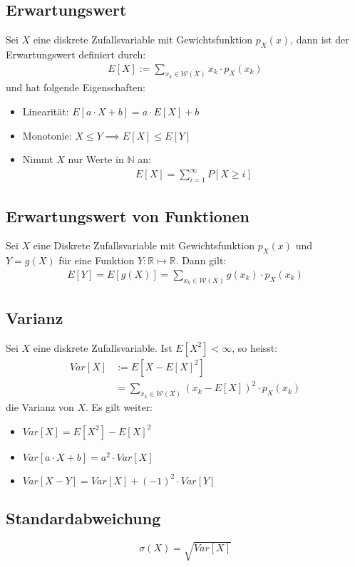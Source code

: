 \documentclass[8pt]{extarticle}
\newcommand{\N}{\mathbb{N}}
\newcommand{\R}{\mathbb{R}}
\newcommand{\W}{\mathcal{W}}
\newcommand{\Sinfty}{\sum_{i = 1}^\infty}
\begin{document}
\begin{multicols*}{3}
  \subsection*{Erwartungswert}
  Sei $X$ eine diskrete Zufallsvariable mit Gewichtsfunktion $p_X (x)$, dann ist
  der Erwartungswert definiert durch:
  \begin{align*}
    E[X] := \sum_{x_k \in \W (X)} x_k \cdot p_X (x_k)
  \end{align*}
  und hat folgende Eigenschaften:
  \begin{itemize}
    \item Linearität: $E[a \cdot X + b] = a \cdot E[X] + b$
    \item Monotonie: $X \leq Y \implies E[X] \leq E[Y]$
    \item Nimmt $X$ nur Werte in $\N $ an:
          \begin{align*}
            E[X] = \Sinfty P[X \geq i]
          \end{align*}
  \end{itemize}
  \subsection*{Erwartungswert von Funktionen}
  Sei $X$ eine Diskrete Zufallsvariable mit Gewichtsfunktion $p_X (x)$ und $Y =
    g (X)$ für eine Funktion $Y: \R \mapsto \R$. Dann gilt:
  \begin{align*}
    E[Y] = E[g (X)] = \sum_{x_k \in \W (X)} g (x_k) \cdot p_X (x_k)
  \end{align*}
  \subsection*{Varianz}
  Sei $X$ eine diskrete Zufallsvariable. Ist $E[X^2] < \infty$, so heisst:
  \begin{align*}
    Var[X] & := E[ {X - E[X]}^2]                                   \\
           & = \sum_{x_k \in \W (X)}  (x_k - E[X])^2 \cdot p_X (x_k)
  \end{align*}
  die Varianz von $X$. Es gilt weiter:
  \begin{itemize}
    \item $Var[X] = E[X^2] - E[X]^2$
    \item $Var[a \cdot X + b] = a^2 \cdot Var[X]$
    \item $Var[X - Y] = Var[X] +  (-1)^2 \cdot Var[Y]$
  \end{itemize}
  \subsection*{Standardabweichung}
  $$
    \sigma (X) = \sqrt{Var[X]}
  $$

\end{multicols*}
\end{document}
